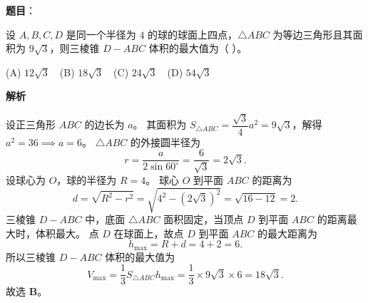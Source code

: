 \begin{answer}

\textbf{题目}：

设 $A, B, C, D$ 是同一个半径为 $4$ 的球的球面上四点，$\triangle ABC$ 为等边三角形且其面积为 $9\sqrt3$，则三棱锥 $D - ABC$ 体积的最大值为（ ）。

(A) $12\sqrt3$　(B) $18\sqrt3$　(C) $24\sqrt3$　(D) $54\sqrt3$

\textbf{解析}

设正三角形 $ABC$ 的边长为 $a$。
其面积为 $S_{\triangle ABC} = \dfrac{\sqrt3}{4} a^2 = 9\sqrt3$，解得 $a^2 = 36 \implies a = 6$。
$\triangle ABC$ 的外接圆半径为
\nopagebreak[4]
\[r = \dfrac{a}{2\sin 60^\circ} = \dfrac{6}{\sqrt3} = 2\sqrt3.\]
设球心为 $O$，球的半径为 $R = 4$。
球心 $O$ 到平面 $ABC$ 的距离为
\nopagebreak[4]
\[d = \sqrt{R^2 - r^2} = \sqrt{4^2 - (2\sqrt3)^2} = \sqrt{16 - 12} = 2.\]
三棱锥 $D - ABC$ 中，底面 $\triangle ABC$ 面积固定，当顶点 $D$ 到平面 $ABC$ 的距离最大时，体积最大。
点 $D$ 在球面上，故点 $D$ 到平面 $ABC$ 的最大距离为
\nopagebreak[4]
\[h_{\max} = R + d = 4 + 2 = 6.\]
所以三棱锥 $D - ABC$ 体积的最大值为
\nopagebreak[4]
\[V_{\max} = \dfrac13 S_{\triangle ABC} h_{\max} = \dfrac13 \times 9\sqrt3 \times 6 = 18\sqrt3.\]
故选 \textbf{B}。


\end{answer}
